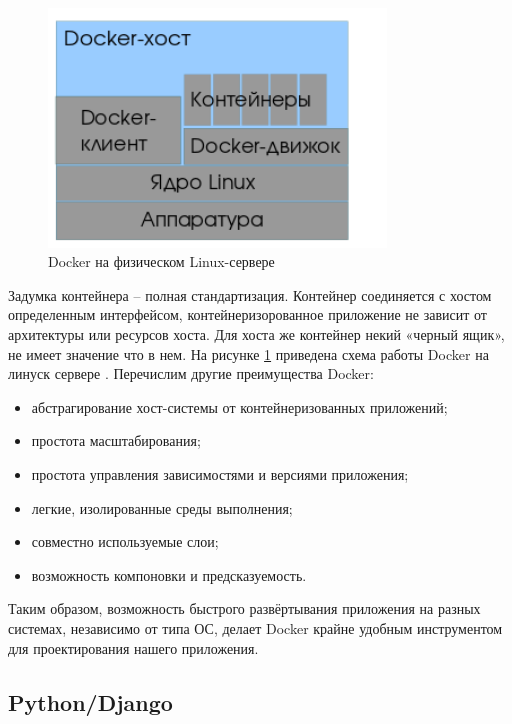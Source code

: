 \begin{figure}
  \centering
  \includegraphics[width=0.8\textwidth]{images/docker.png}
  \caption{Docker на физическом Linux-сервере\label{docker}}
\end{figure}

Задумка контейнера – полная стандартизация. Контейнер соединяется с хостом
определенным интерфейсом, контейнеризорованное приложение не зависит от архитектуры
или ресурсов хоста. Для хоста же контейнер некий «черный ящик», не имеет значение что в нем.
На рисунке \ref{docker} приведена схема работы Docker на линуск сервере \cite{docker}.
Перечислим другие преимущества Docker:

\begin{itemize}[wide,topsep=0pt]
  \itemsep0em
  \item абстрагирование хост-системы от контейнеризованных приложений;
  \item простота масштабирования;
  \item простота управления зависимостями и версиями приложения;
  \item легкие, изолированные среды выполнения;
  \item совместно используемые слои;
  \item возможность компоновки и предсказуемость.
\end{itemize}

Таким образом, возможность быстрого развёртывания приложения на разных системах,
независимо от типа ОС, делает Docker крайне удобным инструментом для проектирования
нашего приложения.


\subsection{Python/Django}

